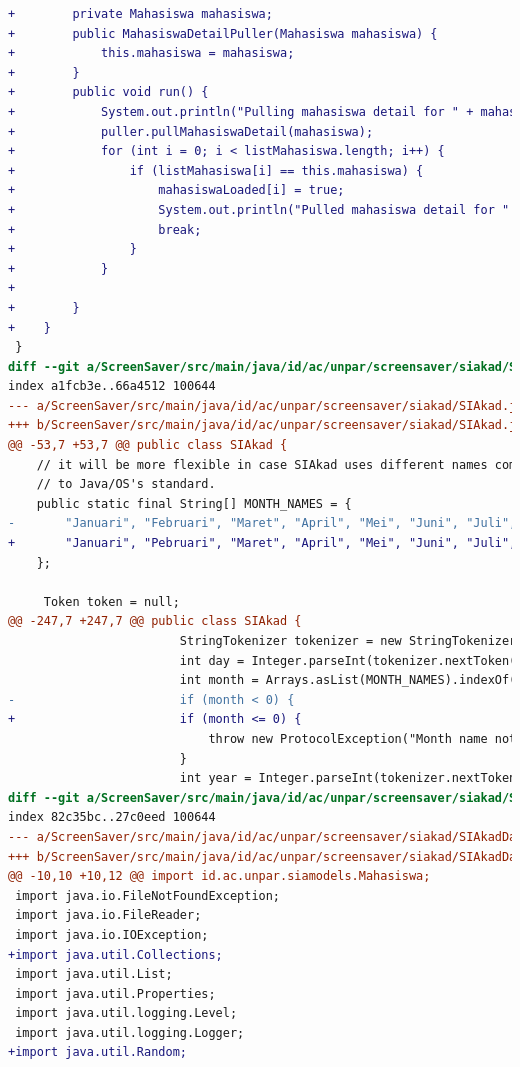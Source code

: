 \begin{lstlisting}[language=diff, caption=Perbedaan kode dosen dengan mahasiswa, label=diff_dosen_mahasiswa]
+        private Mahasiswa mahasiswa;
+        public MahasiswaDetailPuller(Mahasiswa mahasiswa) {
+            this.mahasiswa = mahasiswa;
+        }
+        public void run() {
+            System.out.println("Pulling mahasiswa detail for " + mahasiswa.getNama());
+            puller.pullMahasiswaDetail(mahasiswa);
+            for (int i = 0; i < listMahasiswa.length; i++) {
+                if (listMahasiswa[i] == this.mahasiswa) {
+                    mahasiswaLoaded[i] = true;
+                    System.out.println("Pulled mahasiswa detail for " + mahasiswa.getNama() + " (index " + i + ")");
+                    break;
+                }
+            }
+            
+        }
+    }
 }
diff --git a/ScreenSaver/src/main/java/id/ac/unpar/screensaver/siakad/SIAkad.java b/ScreenSaver/src/main/java/id/ac/unpar/screensaver/siakad/SIAkad.java
index a1fcb3e..66a4512 100644
--- a/ScreenSaver/src/main/java/id/ac/unpar/screensaver/siakad/SIAkad.java
+++ b/ScreenSaver/src/main/java/id/ac/unpar/screensaver/siakad/SIAkad.java
@@ -53,7 +53,7 @@ public class SIAkad {
 	// it will be more flexible in case SIAkad uses different names compared
 	// to Java/OS's standard.
 	public static final String[] MONTH_NAMES = {
-		"Januari", "Februari", "Maret", "April", "Mei", "Juni", "Juli", "Agustus", "September", "Oktober", "November", "Desember"
+		"Januari", "Pebruari", "Maret", "April", "Mei", "Juni", "Juli", "Agustus", "September", "Oktober", "November", "Desember"
 	};
 
     Token token = null;
@@ -247,7 +247,7 @@ public class SIAkad {
 						StringTokenizer tokenizer = new StringTokenizer(fieldValue);
 						int day = Integer.parseInt(tokenizer.nextToken());
 						int month = Arrays.asList(MONTH_NAMES).indexOf(tokenizer.nextToken()) + 1;
-						if (month < 0) {
+						if (month <= 0) {
 							throw new ProtocolException("Month name not recognized in this date: " + fieldValue);
 						}
 						int year = Integer.parseInt(tokenizer.nextToken());
diff --git a/ScreenSaver/src/main/java/id/ac/unpar/screensaver/siakad/SIAkadDataPuller.java b/ScreenSaver/src/main/java/id/ac/unpar/screensaver/siakad/SIAkadDataPuller.java
index 82c35bc..27c0eed 100644
--- a/ScreenSaver/src/main/java/id/ac/unpar/screensaver/siakad/SIAkadDataPuller.java
+++ b/ScreenSaver/src/main/java/id/ac/unpar/screensaver/siakad/SIAkadDataPuller.java
@@ -10,10 +10,12 @@ import id.ac.unpar.siamodels.Mahasiswa;
 import java.io.FileNotFoundException;
 import java.io.FileReader;
 import java.io.IOException;
+import java.util.Collections;
 import java.util.List;
 import java.util.Properties;
 import java.util.logging.Level;
 import java.util.logging.Logger;
+import java.util.Random;
 

\end{lstlisting}
